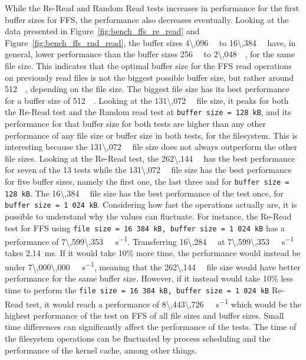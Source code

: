 While the \mbox{Re-Read} and Random Read tests increases in performance for the first buffer sizes for \gls{FFS}, the performance also decreases eventually. Looking at the data presented in Figure~\ref{fig:bench_ffs_re_read} and Figure~\ref{fig:bench_ffs_rnd_read}, the buffer sizes \SI[per-mode = symbol]{4\,096}{\kilo\byte} to \SI[per-mode = symbol]{16\,384}{\kilo\byte} have, in general, lower performance than the buffer sizes \SI[per-mode = symbol]{256}{\kilo\byte} to \SI[per-mode = symbol]{2\,048}{\kilo\byte}, for the same file size. This indicates that the optimal buffer size for the \gls{FFS} read operations on previously read files is not the biggest possible buffer size, but rather around \SI[per-mode = symbol]{512}{\kilo\byte}, depending on the file size. The biggest file size has its best performance for a buffer size of \SI[per-mode = symbol]{512}{\kilo\byte}. Looking at the \SI[per-mode = symbol]{131\,072}{\kilo\byte} file size, it peaks for both the \mbox{Re-Read} test and the Random read test at \texttt{buffer size = 128\,kB}, and its performance for that buffer size for both tests are higher than any other performance of any file size or buffer size in both tests, for the filesystem. This is interesting because the \SI[per-mode = symbol]{131\,072}{\kilo\byte} file size does not always outperform the other file sizes. Looking at the \mbox{Re-Read} test, the \SI[per-mode = symbol]{262\,144}{\kilo\byte} has the best performance for seven of the 13 tests while the \SI[per-mode = symbol]{131\,072}{\kilo\byte} file size has the best performance for five buffer sizes, namely the first one, the last three and for \texttt{buffer size = 128\,kB}. The \SI[per-mode = symbol]{16\,384}{\kilo\byte} file size has the best performance of the test once, for \texttt{buffer size = 1\,024\,kB}. Considering how fast the operations actually are, it is possible to understand why the values can fluctuate. For instance, the \mbox{Re-Read} test for \gls{FFS} using \texttt{file size = 16\,384\,kB, buffer size = 1\,024\,kB} has a performance of \SI[per-mode = symbol]{7\,599\,353}{\kilo\byte\per\second}. Transferring \SI[per-mode = symbol]{16\,284}{\kilo\byte} at \SI[per-mode = symbol]{7\,599\,353}{\kilo\byte\per\second} takes \SI[per-mode = symbol]{2.14}{\milli\second}. If it would take 10\% more time, the performance would instead be under \SI[per-mode = symbol]{7\,000\,000}{\kilo\byte\per\second}, meaning that the \SI[per-mode = symbol]{262\,144}{\kilo\byte} file size would have better performance for the same buffer size. However, if it instead would take 10\% less time to perform the \texttt{file size = 16\,384\,kB, buffer size = 1\,024\,kB} \mbox{Re-Read} test, it would reach a performance of \SI[per-mode = symbol]{8\,443\,726}{\kilo\byte\per\second} which would be the highest performance of the test on \gls{FFS} of all file sizes and buffer sizes. Small time differences can significantly affect the performance of the tests. The time of the filesystem operations can be fluctuated by process scheduling and the performance of the kernel cache, among other things.

